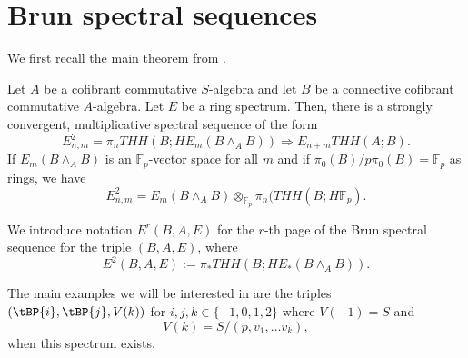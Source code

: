 \section{Brun spectral sequences}
We first recall the main theorem from \cite{Hon18}. 
\begin{thm}\label{Honing}
Let $A$ be a cofibrant commutative $S$-algebra and let $B$ be a connective cofibrant commutative $A$-algebra. Let $E$ be a ring spectrum. Then, there is a strongly convergent, multiplicative spectral sequence of the form
\[ E^2_{n,m} = \pi_n THH(B; HE_m(B\wedge_{A}B)) \Rightarrow E_{n+m}THH(A; B).\]
If $E_{m}(B\wedge_{A}B)$ is an $\mathbb{F}_p$-vector space for all $m$ and if $\pi_0(B)/p\pi_0(B)=\mathbb{F}_p$ as rings, we have
\[ E^2_{n,m}= E_m (B\wedge_{A}  B )\otimes_{\mathbb{F}_p}  \pi_n( THH( B ; H\mathbb{F}_p ).\]
\end{thm}
\begin{not*}
We introduce notation $E^r(B,A,E)$ for the $r$-th page of the Brun spectral sequence for the triple $(B,A,E)$, where 
\[E^2(B,A,E):= \pi_* THH(B; HE_*(B\wedge_{A}B)).\]
\end{not*}
The main examples we will be interested in are the triples $(\tBP{i} , \tBP{j} , V(k))$ for $i,j,k\in \{ -1,0,1,2 \}$ where $V(-1)=S$ and 
\[V(k)=S/(p,v_1,\dots v_k),\]
when this spectrum exists.
